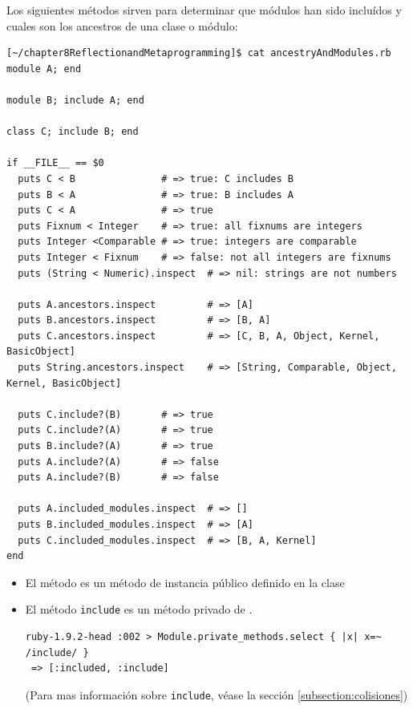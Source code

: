 Los siguientes métodos sirven para determinar que módulos han sido incluídos 
y cuales son los ancestros de una clase o módulo:
\begin{verbatim}
[~/chapter8ReflectionandMetaprogramming]$ cat ancestryAndModules.rb 
module A; end

module B; include A; end

class C; include B; end

if __FILE__ == $0
  puts C < B               # => true: C includes B
  puts B < A               # => true: B includes A
  puts C < A               # => true
  puts Fixnum < Integer    # => true: all fixnums are integers
  puts Integer <Comparable # => true: integers are comparable
  puts Integer < Fixnum    # => false: not all integers are fixnums
  puts (String < Numeric).inspect  # => nil: strings are not numbers
  
  puts A.ancestors.inspect         # => [A]
  puts B.ancestors.inspect         # => [B, A]
  puts C.ancestors.inspect         # => [C, B, A, Object, Kernel, BasicObject]
  puts String.ancestors.inspect    # => [String, Comparable, Object, Kernel, BasicObject]
 
  puts C.include?(B)       # => true
  puts C.include?(A)       # => true
  puts B.include?(A)       # => true
  puts A.include?(A)       # => false 
  puts A.include?(B)       # => false

  puts A.included_modules.inspect  # => []
  puts B.included_modules.inspect  # => [A]
  puts C.included_modules.inspect  # => [B, A, Kernel]
end
\end{verbatim}

\begin{itemize}
\item
El método  es un método de instancia público definido en la clase \Module{}
\item
El método \verb|include| es un método privado de \Module{}.
\begin{verbatim}
ruby-1.9.2-head :002 > Module.private_methods.select { |x| x=~ /include/ }
 => [:included, :include] 
\end{verbatim}
(Para mas información sobre \verb|include|, véase la sección \ref{subsection:colisiones})
\end{itemize}

